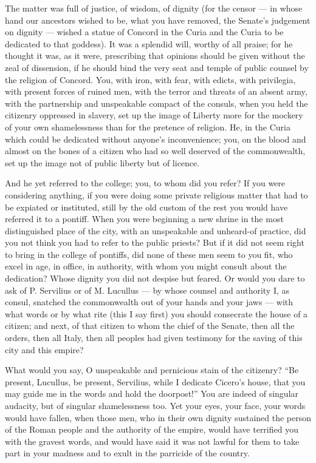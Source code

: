  The matter was full of justice, of wisdom, of dignity (for the censor --- in whose hand our ancestors wished to be, what you have removed, the Senate's judgement on dignity --- wished a statue of Concord in the Curia and the Curia to be dedicated to that goddess). It was a splendid will, worthy of all praise; for he thought it was, as it were, prescribing that opinions should be given without the zeal of dissension, if he should bind the very seat and temple of public counsel by the religion of Concord. You, with iron, with fear, with edicts, with privilegia, with present forces of ruined men, with the terror and threats of an absent army, with the partnership and unspeakable compact of the consuls, when you held the citizenry oppressed in slavery, set up the image of Liberty more for the mockery of your own shamelessness than for the pretence of religion. He, in the Curia which could be dedicated without anyone's inconvenience; you, on the blood and almost on the bones of a citizen who had so well deserved of the commonwealth, set up the image not of public liberty but of licence.

 And he yet referred to the college; you, to whom did you refer? If you were considering anything, if you were doing some private religious matter that had to be expiated or instituted, still by the old custom of the rest you would have referred it to a pontiff. When you were beginning a new shrine in the most distinguished place of the city, with an unspeakable and unheard-of practice, did you not think you had to refer to the public priests? But if it did not seem right to bring in the college of pontiffs, did none of these men seem to you fit, who excel in age, in office, in authority, with whom you might consult about the dedication? Whose dignity you did not despise but feared. Or would you dare to ask of P. Servilius or of M. Lucullus --- by whose counsel and authority I, as consul, snatched the commonwealth out of your hands and your jaws --- with what words or by what rite (this I say first) you should consecrate the house of a citizen; and next, of that citizen to whom the chief of the Senate, then all the orders, then all Italy, then all peoples had given testimony for the saving of this city and this empire?

 What would you say, O unspeakable and pernicious stain of the citizenry? ``Be present, Lucullus, be present, Servilius, while I dedicate Cicero's house, that you may guide me in the words and hold the doorpost!'' You are indeed of singular audacity, but of singular shamelessness too. Yet your eyes, your face, your words would have fallen, when those men, who in their own dignity sustained the person of the Roman people and the authority of the empire, would have terrified you with the gravest words, and would have said it was not lawful for them to take part in your madness and to exult in the parricide of the country.

